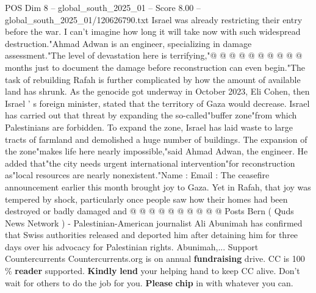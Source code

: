 \begin{textsample}{POS Dim 8 – global\_south\_2025\_01 – Score 8.00 – global\_south\_2025\_01/120626790.txt}
Israel was already restricting their entry before the war.
I can't imagine how long it will take now with such widespread destruction."Ahmad Adwan is an engineer, specializing in damage assessment."The level of devastation here is terrifying,"@ @ @ @ @ @ @ @ @ @ months just to document the damage before reconstruction can even begin."The task of rebuilding Rafah is further complicated by how the amount of available land has shrunk.
As the genocide got underway in October 2023, Eli Cohen, then Israel ' s foreign minister, stated that the territory of Gaza would decrease.
Israel has carried out that threat by expanding the so-called"buffer zone"from which Palestinians are forbidden.
To expand the zone, Israel has laid waste to large tracts of farmland and demolished a huge number of buildings.
The expansion of the zone"makes life here nearly impossible,"said Ahmad Adwan, the engineer.
He added that"the city needs urgent international intervention"for reconstruction as"local resources are nearly nonexistent."Name : Email : The ceasefire announcement earlier this month brought joy to Gaza.
Yet in Rafah, that joy was tempered by shock, particularly once people saw how their homes had been destroyed or badly damaged and @ @ @ @ @ @ @ @ @ @ Posts Bern ( Quds News Network ) - Palestinian-American journalist Ali Abunimah has confirmed that Swiss authorities released and deported him after detaining him for three days over his advocacy for Palestinian rights.
Abunimah,...
Support Countercurrents Countercurrents.org is on annual \textbf{fundraising} drive.
CC is 100 \% \textbf{reader} supported. \textbf{Kindly} \textbf{lend} your helping hand to keep CC alive.
Don't wait for others to do the job for you. \textbf{Please} \textbf{chip} in with whatever you can.

\end{textsample}

